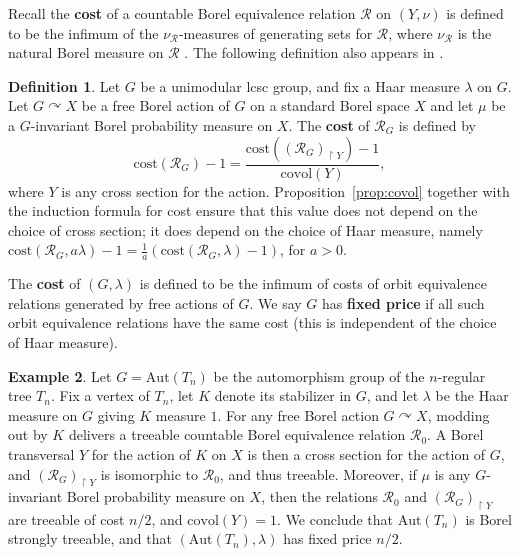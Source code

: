 \documentclass[11pt]{amsart}
\theoremstyle{definition}
\newtheorem{definition}{Definition}[section]
\newtheorem{example}[definition]{Example}
\theoremstyle{plain}
\newcommand{\<}{\langle}
\renewcommand{\>}{\rangle}
\newcommand{\define}[1]{\textbf{#1}}
\newcommand{\pmp}{\text{p.m.p.}}
\newcommand\RR{\mathscr{R}}
\begin{document}
\begin{appendices}
Recall the \define{cost} of a \pmp{} countable Borel equivalence relation $\RR$ on $(Y,\nu )$ is defined to be the infimum of the $\nu _{\RR}$-measures of generating sets for $\RR$, where $\nu _{\RR}$ is the natural Borel measure on $\RR$ \cite{Gab00a}. The following definition also appears in \cite[Definition 3.1]{carderi2018asymptotic}.


\begin{definition}\label{def:lcsccost}
Let $G$ be a unimodular lcsc group, and fix a Haar measure $\lambda$ on $G$. Let $G\curvearrowright X$ be a free Borel action of $G$ on a standard Borel space $X$ and let $\mu$ be a $G$-invariant Borel probability measure on $X$. The \define{cost} of $\RR_G$ is defined by
\[
\mathrm{cost}(\RR_G) - 1 = \frac{\mathrm{cost}(({\RR_G})_{\restriction Y}) - 1}{\mathrm{covol}(Y)},
\]
where $Y$ is any cross section for the action.  Proposition~\ref{prop:covol} together with the induction formula for cost  \cite[Proposition II.6]{Gab00a} ensure that this value does not depend on the choice of cross section; it does depend on the choice of Haar measure, namely 
$\mathrm{cost}(\RR_G,a\lambda ) -1 = \frac{1}{a}(\mathrm{cost}(\RR_G,\lambda )-1)$,
for $a>0$.

The \define{cost} of $(G,\lambda )$ is defined to be the infimum of costs of orbit equivalence relations generated by free \pmp{} actions of $G$. 
We say $G$ has \define{fixed price} if all such orbit equivalence relations have the same cost (this is independent of the choice of Haar measure).
\end{definition}

\begin{example}
Let $G=\mathrm{Aut}(T_n)$ be the automorphism group of the $n$-regular tree $T_n$. Fix a vertex of $T_n$, let $K$ denote its stabilizer in $G$, and let $\lambda$ be the Haar measure on $G$ giving $K$ measure $1$. For any free Borel action $G\curvearrowright X$, modding out by $K$ delivers a treeable countable Borel equivalence relation $\RR_0$. A Borel transversal $Y$ for the action of $K$ on $X$ is then a cross section for the action of $G$, and $(\RR_{G})_{\restriction Y}$ is isomorphic to $\RR_0$, and thus treeable. Moreover, if $\mu$ is any $G$-invariant Borel probability measure on $X$, then the relations $\RR_0$ and $(\RR_{G})_{\restriction Y}$ are \pmp{} treeable of cost $n/2$, and $\mathrm{covol}(Y)=1$.  We conclude that $\mathrm{Aut}(T_n)$ is Borel strongly treeable, and that $(\mathrm{Aut}(T_n),\lambda )$ has fixed price $n/2$.
\end{example}


\end{appendices}
\end{document}
